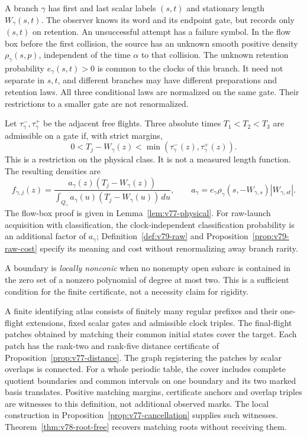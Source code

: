 A branch $\gamma$ has first and last scalar labels $(s,t)$ and
stationary length $W_\gamma(s,t)$.  The observer knows its word and its
endpoint gate, but records only $(s,t)$ on retention.  An unsuccessful
attempt has a failure symbol.  In the flow box before the first collision,
the source has an unknown smooth positive density $\rho_\gamma(s,p)$,
independent of the time $\alpha$ to that collision.  The unknown
retention probability $e_\gamma(s,t)>0$ is common to the clocks of this
branch.  It need not separate in $s,t$, and different branches may have
different preparations and retention laws.  All three conditional laws
are normalized on the same gate.  Their restrictions to a smaller gate
are not renormalized.

Let $\tau^-_\gamma,\tau^+_\gamma$ be the adjacent free flights.  Three
absolute times $T_1<T_2<T_3$ are admissible on a gate if, with strict
margins,
\begin{equation}\label{eq:v77-window}
 0<T_j-W_\gamma(z)<\min(\tau^-_\gamma(z),\tau^+_\gamma(z)).
\end{equation}
This is a restriction on the physical class.  It is not a measured
length function.  The resulting densities are
\begin{equation}\label{eq:v78-intro-law}
 f_{\gamma,j}(z)=
 \frac{a_\gamma(z)(T_j-W_\gamma(z))}
 {\int_{Q_\gamma}a_\gamma(u)(T_j-W_\gamma(u))\,du},\qquad
 a_\gamma=e_\gamma\rho_\gamma(s,-W_{\gamma,s})
                   |W_{\gamma,st}|.
\end{equation}
The flow-box proof is given in Lemma~\ref{lem:v77-physical}.
For raw-launch acquisition with classification, the clock-independent
classification probability is an additional factor of $a_\gamma$;
Definition~\ref{def:v79-raw} and Proposition~\ref{prop:v79-raw-cost}
specify its meaning and cost without renormalizing away branch rarity.

A boundary is \emph{locally nonconic} when no nonempty open subarc
is contained in the zero set of a nonzero polynomial of degree at most two.
This is a sufficient condition for the finite certificate, not a
necessity claim for rigidity.

\begin{definition}\label{def:v77-atlas}
A finite identifying atlas consists of finitely many regular prefixes
and their one-flight extensions, fixed scalar gates and admissible clock
triples.  The final-flight patches obtained by matching their common
initial states cover the target.  Each patch has the rank-two and
rank-five distance certificate of Proposition~\ref{prop:v77-distance}.
The graph registering the patches by scalar overlaps is connected.
For a whole periodic table, the cover includes complete quotient
boundaries and common intervals on one boundary and its two marked basis
translates.  Positive matching margins, certificate anchors and overlap
triples are witnesses to this definition, not additional observed marks.
The local construction in Proposition~\ref{prop:v77-cancellation} supplies
such witnesses.  Theorem~\ref{thm:v78-root-free} recovers matching roots
without receiving them.
\end{definition}

